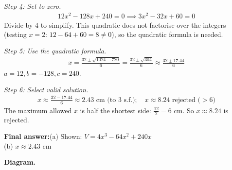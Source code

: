 \documentclass[11pt]{article}
\begin{document}
\textit{Step 4: Set to zero.}
\[\begin{gathered}
12x^2 - 128x + 240 = 0 \implies 3x^2 - 32x + 60 = 0
\end{gathered}\]
Divide by 4 to simplify. This quadratic does not factorise over the integers (testing \( x = 2 \): \( 12 - 64 + 60 = 8 \neq 0 \)), so the quadratic formula is needed.

\textit{Step 5: Use the quadratic formula.}
\[\begin{gathered}
x = \frac{32 \pm \sqrt{1024 - 720}}{6} = \frac{32 \pm \sqrt{304}}{6} \approx \frac{32 \pm 17.44}{6}
\end{gathered}\]
\( a = 12, b = -128, c = 240 \).

\textit{Step 6: Select valid solution.}
\[\begin{gathered}
x \approx \frac{32 - 17.44}{6} \approx 2.43 \text{ cm (to 3 s.f.)}; \quad x \approx 8.24 \text{ rejected (} > 6\text{)}
\end{gathered}\]
The maximum allowed \( x \) is half the shortest side: \( \tfrac{12}{2} = 6 \) cm. So \( x \approx 8.24 \) is rejected.

\begin{answerbox}
\textbf{Final answer:}\quad (a) Shown: \(\displaystyle  V = 4x^3 - 64x^2 + 240x \) \\[3pt]  (b) \(\displaystyle  x \approx 2.43 \) cm
\end{answerbox}
\textbf{Diagram.}
\end{document}
